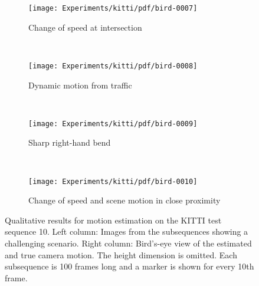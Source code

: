 		
		\begin{figure}[h]
			\centering
			\begin{subfigure}[t]{\linewidth}
				\centering
				\texttt{[image: Experiments/kitti/pdf/bird-0007]}
				\caption{
					Change of speed at intersection
					\label{fig:kitti-qualitative-speed-change}
				}
			\end{subfigure}%
			\\
			\begin{subfigure}[b]{\linewidth}
				\centering
				\texttt{[image: Experiments/kitti/pdf/bird-0008]}
				\caption{
					Dynamic motion from traffic
					\label{fig:kitti-qualitative-traffic-1}
				}
			\end{subfigure}%
			\\
			\begin{subfigure}[b]{\linewidth}
				\centering
				\texttt{[image: Experiments/kitti/pdf/bird-0009]}
				\caption{
					Sharp right-hand bend
					\label{fig:kitti-qualitative-sharp-turn}
				}
			\end{subfigure}%
			\\
			\begin{subfigure}[b]{\linewidth}
				\centering
								\texttt{[image: Experiments/kitti/pdf/bird-0010]}
				\caption{
					Change of speed and scene motion in close proximity
					\label{fig:kitti-qualitative-truck-close-up-stop}
				}
			\end{subfigure}%
			\caption[Qualitative results for motion estimation on KITTI]
					{Qualitative results for motion estimation on the KITTI test sequence 10.
					 Left column: Images from the subsequences showing a challenging scenario.
					 Right column: Bird's-eye view of the estimated and true camera motion.
					 The height dimension is omitted.
					 Each subsequence is 100 frames long and a marker is shown for every 10th frame.
					 \label{fig:kitti-qualitative-results-images-and-estimation}}
		\end{figure}
		

